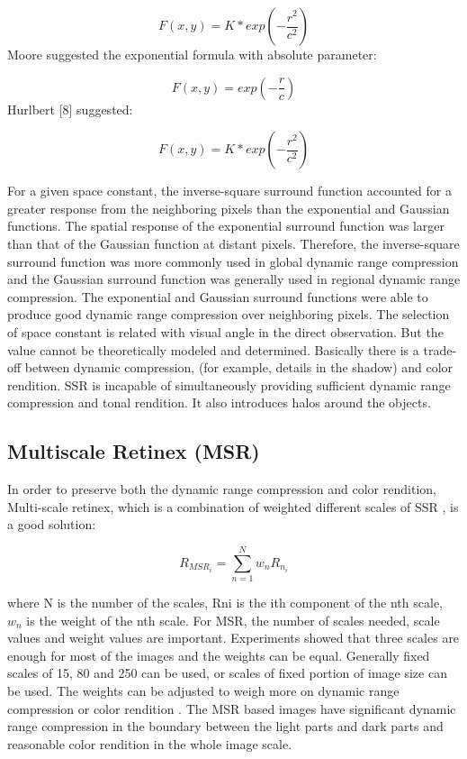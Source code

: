 \begin{equation}
	F(x,y)=K*exp(-\frac{r^2}{c^2})
\end{equation}
Moore suggested the exponential formula with absolute parameter:

\begin{equation}
	F(x,y)=exp(-\frac{r}{c})
\end{equation}
Hurlbert [8] suggested:

\begin{equation}
	F(x,y)=K*exp(-\frac{r^2}{c^2})
\end{equation}

For a given space constant, the inverse-square surround function accounted for a greater response from the neighboring pixels than the exponential and Gaussian functions. The spatial response of the exponential surround function was larger than that of the Gaussian function at distant pixels. Therefore, the inverse-square surround function was more commonly used in global dynamic range compression and the Gaussian surround function was generally used in regional dynamic range compression\cite{ssr}. The exponential and Gaussian surround functions were able to produce good dynamic range
compression over neighboring pixels. The selection of space constant is related with visual angle in the direct observation\cite{ssr}. But the value cannot be theoretically modeled and determined. Basically there is a trade-off between dynamic compression, (for example, details in the shadow) and color rendition. SSR is incapable of simultaneously providing sufficient dynamic range compression and tonal rendition. It also
introduces halos around the objects\cite{ssr}.

\subsection{Multiscale Retinex (MSR)}
In order to preserve both the dynamic range compression and color rendition, Multi-scale retinex\cite{msr}, which is a combination of weighted different scales of SSR \cite{ssr}, is a good solution:

\begin{equation}
	R_{MSR_{i}}=\sum_{n=1}^{N}w_{n}R_{n_{i}}
\end{equation}

where N is the number of the scales, Rni is the ith
component of the nth scale, $w_{n}$ is the weight of the nth
scale. For MSR\cite{msr}, the number of scales needed, scale
values and weight values are important. Experiments
showed that three scales are enough for most of the
images and the weights can be equal\cite{msr}. Generally fixed
scales of 15, 80 and 250 can be used, or scales of fixed
portion of image size can be used. The weights can be
adjusted to weigh more on dynamic range compression
or color rendition \cite{msr}. The MSR based images have
significant dynamic range compression in the boundary
between the light parts and dark parts and reasonable
color rendition in the whole image scale\cite{msr}.

